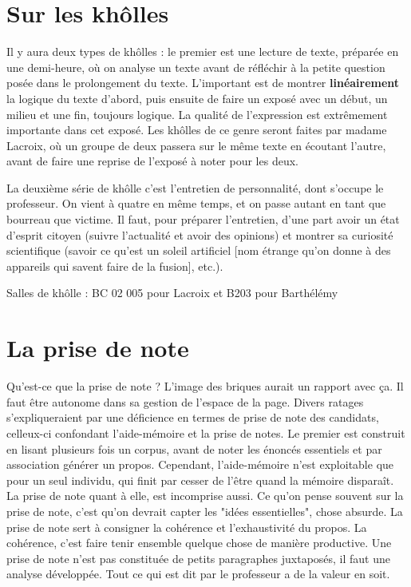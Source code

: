 \documentclass[a4paper,12pt]{book}
\begin{document}
\section{Sur les khôlles}
Il y aura deux types de khôlles : le premier est une lecture de texte, préparée en une demi-heure, où on analyse un texte avant de réfléchir à la petite question posée dans le prolongement du texte. L'important est de montrer \textbf{linéairement} la logique du texte d'abord, puis ensuite de faire un exposé avec un début, un milieu et une fin, toujours logique. La qualité de l'expression est extrêmement importante dans cet exposé. Les khôlles de ce genre seront faites par madame Lacroix, où un groupe de deux passera sur le même texte en écoutant l'autre, avant de faire une reprise de l'exposé à noter pour les deux.
\par La deuxième série de khôlle c'est l'entretien de personnalité, dont s'occupe le professeur. On vient à quatre en même temps, et on passe autant en tant que bourreau que victime. Il faut, pour préparer l'entretien, d'une part avoir un état d'esprit citoyen (suivre l'actualité et avoir des opinions) et montrer sa curiosité scientifique (savoir ce qu'est un soleil artificiel [nom étrange qu'on donne à des appareils qui savent faire de la fusion], etc.).
\par Salles de khôlle : BC 02 005 pour Lacroix et B203 pour Barthélémy
\section{La prise de note}
Qu'est-ce que la prise de note ? L'image des briques aurait un rapport avec ça. Il faut être autonome dans sa gestion de l'espace de la page. Divers ratages s'expliqueraient par une déficience en termes de prise de note des candidats, celleux-ci confondant l'aide-mémoire et la prise de notes. Le premier est construit en lisant plusieurs fois un corpus, avant de noter les énoncés essentiels et par association générer un propos. Cependant, l'aide-mémoire n'est exploitable que pour un seul individu, qui finit par cesser de l'être quand la mémoire disparaît. La prise de note quant à elle, est incomprise aussi. Ce qu'on pense souvent sur la prise de note, c'est qu'on devrait capter les "idées essentielles", chose absurde. La prise de note sert à consigner la cohérence et l'exhaustivité du propos. La cohérence, c'est faire tenir ensemble quelque chose de manière productive. Une prise de note n'est pas constituée de petits paragraphes juxtaposés, il faut une analyse développée. Tout ce qui est dit par le professeur a de la valeur en soit.
\end{document}
